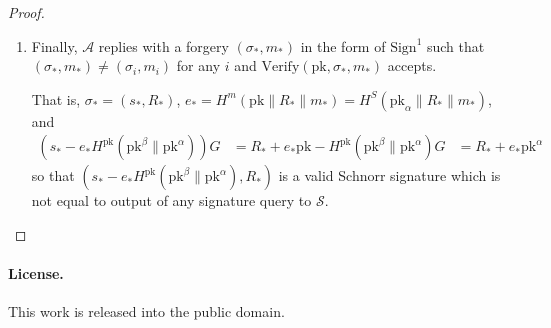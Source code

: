 \documentclass[letterpaper]{article}
\newcommand{\Sign}{\mathrm{Sign}}
\newcommand{\Verify}{\mathrm{Verify}}
\newcommand{\pk}{\mathrm{pk}}
\begin{document}
\begin{proof}
\begin{enumerate}
\item Finally, $\mathcal{A}$ replies with a forgery $(\sigma_*, m_*)$ in the
form of $\Sign^1$ such that $(\sigma_*,m_*)\neq(\sigma_i,m_i)$ for any $i$
and $\Verify(\pk,\sigma_*, m_*)$ accepts.

That is, $\sigma_* = (s_*, R_*)$, $e_* = H^m(\pk\|R_*\|m_*) = H^S(\pk_\alpha\|R_*\|m_*)$, and
\begin{align*}
(s_* - e_*H^\pk(\pk^\beta\|\pk^\alpha))G
    &= R_* + e_*\pk - H^\pk(\pk^\beta\|\pk^\alpha)G
    &= R_* + e_*\pk^\alpha
\end{align*}
so that $(s_* - e_*H^\pk(\pk^\beta\|\pk^\alpha), R_*)$ is a valid Schnorr
signature which is not equal to output of any signature query to $\mathcal{S}$.
\end{enumerate}

\end{proof}

\paragraph{License.} This work is released into the public domain.
\end{document}
